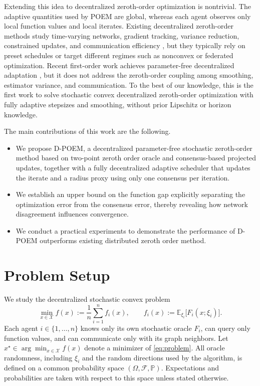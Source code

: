 \documentclass[runningheads]{llncs}
\newcommand{\E}{\mathbb{E}}
\newcommand{\Prob}{\mathbb{P}}
\begin{document}
Extending this idea to decentralized zeroth-order optimization is nontrivial.
The adaptive quantities used by POEM are global, whereas each agent observes
only local function values and local iterates. Existing decentralized
zeroth-order methods study time-varying networks, gradient tracking, variance
reduction, constrained updates, and communication efficiency
\cite{hou2024distributed,li2021distributed,li2024achieving,lin2024decentralized,mhanna2023single,mu2024}, but they typically
rely on preset schedules or target different regimes such as nonconvex or
federated optimization. Recent first-order work achieves parameter-free
decentralized adaptation \cite{kuruzov2024achieving}, but it does not address the
zeroth-order coupling among smoothing, estimator variance, and communication.
To the best of our knowledge, this is the first work  to solve stochastic 
convex decentralized zeroth-order optimization with fully
adaptive stepsizes and smoothing, without prior Lipschitz or horizon knowledge. 

The main contributions of this work are the following.
\begin{itemize}
\item We propose D-POEM, a decentralized parameter-free stochastic zeroth-order
    method based on two-point zeroth order oracle and consensus-based projected 
    updates, together with a fully decentralized adaptive scheduler that updates 
    the iterate and a radius proxy using only one consensus per iteration.
\item We establish an upper bound on the function gap  explicitly separating the optimization 
        error from the consensus error, thereby revealing how network 
        disagreement influences convergence.
\item We conduct a practical experiments to demonstrate the performance of D-POEM
    outperforms existing distributed zeroth order method.
\end{itemize}
\section{Problem Setup}

We study the decentralized stochastic convex problem
\begin{equation}
\label{eq:problem}
\min_{x \in \mathcal{X}} f(x)
:=
\frac{1}{n}\sum_{i=1}^n f_i(x),
\qquad
f_i(x) := \E_{\xi_i}\big[F_i(x;\xi_i)\big].
\end{equation}
Each agent $i \in \{1,\dots,n\}$ knows only its own stochastic oracle $F_i$,
can query only function values, and can communicate only with its graph neighbors.
Let \(x^\star\in\arg\min_{x\in \mathcal{X}} f(x)\) denote a minimizer of \eqref{eq:problem}.
All oracle randomness, including \(\xi_i\) and the random directions used by
the algorithm, is defined on a common probability space
\((\Omega,\mathcal{F},\Prob)\). Expectations and probabilities are taken with
respect to this space unless stated otherwise.
\end{document}

